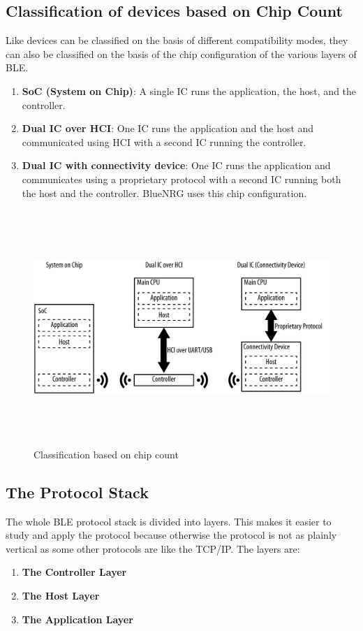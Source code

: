 \subsection{Classification of devices based on Chip Count}
Like devices can be classified on the basis of different compatibility modes, they can also be classified on the basis of the chip configuration of the various layers of BLE.
\begin{enumerate}
	\item \textbf{SoC (System on Chip)}: A single IC runs the application, the host, and the controller.
	\item \textbf{Dual IC over HCI}: One IC runs the application and the host and communicated using HCI with a second IC running the controller.
	\item \textbf{Dual IC with connectivity device}: One IC runs the application and communicates using a proprietary protocol with a second IC running both the host and the controller. BlueNRG uses this chip configuration.
\end{enumerate}
\begin{figure}[ht]
	\centering
	\includegraphics[width=4.5in, height=3.5in]{images/chip_count.png}
	\caption{Classification based on chip count}
\end{figure}
\subsection{The Protocol Stack}
The whole BLE protocol stack is divided into layers. This makes it easier to study and apply the protocol because otherwise the protocol is not as plainly vertical as some other protocols are like the TCP/IP. The layers are:
\begin{enumerate}
	\item \textbf{The Controller Layer}
	\item \textbf{The Host Layer}
	\item \textbf{The Application Layer}
\end{enumerate}
